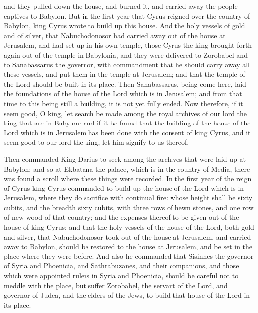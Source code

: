 {and they pulled down the house, and burned it, and carried away the people captives to Babylon.
But in the first year that Cyrus reigned over the country of Babylon, king Cyrus wrote to build up this house.
And the holy vessels of gold and of silver, that Nabuchodonosor had carried away out of the house at Jerusalem, and had set up in his own temple, those Cyrus the king brought forth again out of the temple in Babylonia, and they were delivered to Zorobabel and to
 Sanabassarus the governor,
with commandment that he should carry away
 all these vessels, and put them in the temple at Jerusalem; and that the temple of the Lord should be built in its place.
Then Sanabassarus, being come here, laid the foundations of the house of the Lord which is in Jerusalem; and from that time to this being still a building, it is not yet fully ended.
Now therefore, if it seem good, O king, let search be made among the royal archives of our lord the king that are in Babylon:
and if it be found that the building of the house of the Lord which is in Jerusalem has been done with the consent of king Cyrus, and it seem good to our lord the king, let him signify to us thereof.
\par }{\PP {} Then commanded King Darius to seek among the archives that were laid up at Babylon: and so at Ekbatana the palace, which is in the country of Media, there was found a
 scroll where these things were recorded.
In the first year of the reign of Cyrus king Cyrus commanded to build up the house of the Lord which is in Jerusalem, where they do sacrifice with continual fire:
whose height shall be sixty cubits, and the breadth sixty cubits, with three rows of hewn stones, and one row of new wood of that country; and the expenses thereof to be given out of the house of king Cyrus:
and that the holy vessels of the house of the Lord, both gold and silver, that Nabuchodonosor took out of the house at Jerusalem, and carried away to Babylon, should be restored to the house at Jerusalem, and be set in the place where they were before.
And also he commanded that Sisinnes the governor of Syria and Phoenicia, and Sathrabuzanes, and their companions, and those which were appointed rulers in Syria and Phoenicia, should be careful not to meddle with the place, but suffer Zorobabel, the servant of the Lord, and governor of Judea, and the elders of the Jews, to build that house of the Lord in its place.
}

